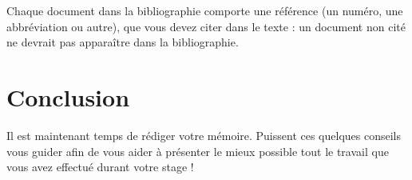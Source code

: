 \documentclass [twoside,openright,a4paper,11pt,french] {report}
\begin{document}
Chaque document dans la bibliographie comporte une référence (un
numéro, une abbréviation ou autre), que vous devez citer dans le texte :
un document non cité ne devrait pas apparaître dans la bibliographie.


\chapter {Conclusion}
    \label {chap:conc}

Il est maintenant temps de rédiger votre mémoire. Puissent ces quelques
conseils vous guider afin de vous aider à présenter le mieux possible
tout le travail que vous avez effectué durant votre stage !



\cleardoublepage


\end{document}
